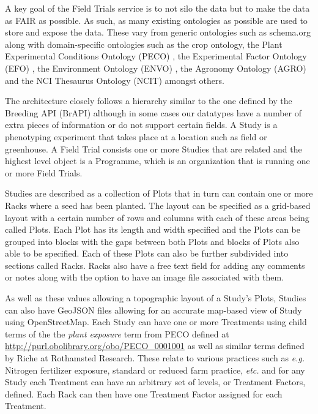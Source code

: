 \documentclass[9pt,a4paper]{extarticle}
\begin{document}
A key goal of the Field Trials service is to not silo the data but to make the data as FAIR\cite{fair_data} as possible. 
As such, as many existing ontologies as possible are used to store and expose the data. 
These vary from generic ontologies such as schema.org along with domain-specific ontologies such as the crop ontology, the Plant Experimental Conditions Ontology (PECO) \cite{peco}, the Experimental Factor Ontology (EFO) \cite{efo}, the Environment Ontology (ENVO) \cite{envo}, the Agronomy Ontology (AGRO) \cite{agro} and the NCI Thesaurus Ontology (NCIT) \cite{ncit} amongst others. 

The architecture closely follows a hierarchy similar to the one defined by the Breeding API (BrAPI) \cite{brapi} although in some cases our datatypes have a number of extra pieces of information or do not support certain fields. 
A Study is a phenotyping experiment that takes place at a location such as field or greenhouse. 
A Field Trial consists one or more Studies that are related and the highest level object is a Programme, which is an organization that is running one or more Field Trials. 

Studies are described as a collection of Plots that in turn can contain one or more Racks where a seed has been planted. 
The layout can be specified as a grid-based layout with a certain number of rows and columns with each of these areas being called Plots. 
Each Plot has its length and width specified and the Plots can be grouped into blocks with the gaps between both Plots and blocks of Plots also able to be specified. 
Each of these Plots can also be further subdivided into sections called Racks.
Racks also have a free text field for adding any comments or notes along with the option to have an image file associated with them.

As well as these values allowing a topographic layout of a Study's Plots, Studies can also have GeoJSON files allowing for an accurate map-based view of Study using OpenStreetMap.
Each Study can have one or more Treatments using child terms of the the \textit{plant exposure} term from PECO defined at \url{http://purl.obolibrary.org/obo/PECO_0001001} as well as similar terms defined by Riche at Rothamsted Research. 
These relate to various practices such as \textit{e.g.} Nitrogen fertilizer exposure, standard or reduced farm practice, \textit{etc.} and for any Study each Treatment can have an arbitrary set of levels, or Treatment Factors, defined. 
Each Rack can then have one Treatment Factor assigned for each Treatment.
\end{document}
